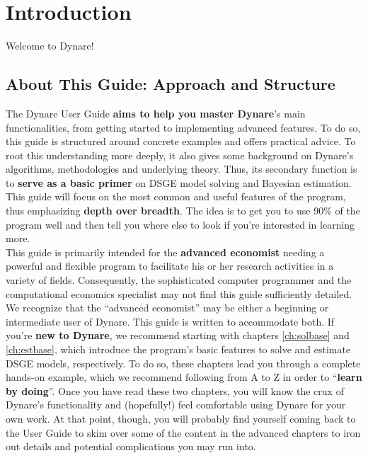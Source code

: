 \chapter{Introduction} \label{ch:intro}

Welcome to Dynare! \\

\section{About This Guide: Approach and Structure}
The Dynare User Guide \textbf{aims to help you master Dynare}'s main functionalities, from getting started to implementing advanced features. To do so, this guide is structured around concrete examples and offers practical advice. To root this understanding more deeply, it also gives some background on Dynare's algorithms, methodologies and underlying theory. Thus, its secondary function is to \textbf{serve as a basic primer} on DSGE model solving and Bayesian estimation. \\

This guide will focus on the most common and useful features of the program, thus emphasizing \textbf{depth over breadth}. The idea is to get you to use 90\% of the program well and then tell you where else to look if you're interested in learning more.\\

This guide is primarily intended for the \textbf{advanced economist} needing a powerful and flexible program to facilitate his or her research activities in a variety of fields. Consequently, the sophisticated computer programmer and the computational economics specialist may not find this guide sufficiently detailed. \\

We recognize that the ``advanced economist'' may be either a beginning or intermediate user of Dynare. This guide is written to accommodate both. If you're \textbf{new to Dynare}, we recommend starting with chapters \ref{ch:solbase} and \ref{ch:estbase}, which introduce the program's basic features to solve and estimate DSGE models, respectively. To do so, these chapters lead you through a complete hands-on example, which we recommend following from A to Z in order to ``\textbf{learn by doing}''. Once you have read these two chapters, you will know the crux of Dynare's functionality and (hopefully!) feel comfortable using Dynare for your own work. At that point, though, you will probably find yourself coming back to the User Guide to skim over some of the content in the advanced chapters to iron out details and potential complications you may run into.\\

